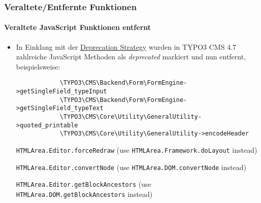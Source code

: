 
\begin{frame}[fragile]
	\frametitle{Veraltete/Entfernte Funktionen}
	\framesubtitle{Veraltete JavaScript Funktionen entfernt}

	\begin{itemize}
		\item In Einklang mit der \href{http://forge.typo3.org/projects/typo3v4-core/wiki/CoreDevPolicy}{Deprecation Strategy}
			wurden in TYPO3 CMS 4.7 zahlreiche JavaScript Methoden als \textit{deprecated} markiert und nun entfernt, beispielsweise:

		\begin{lstlisting}
			\TYPO3\CMS\Backend\Form\FormEngine->getSingleField_typeInput
			\TYPO3\CMS\Backend\Form\FormEngine->getSingleField_typeText
			\TYPO3\CMS\Core\Utility\GeneralUtility->quoted_printable
			\TYPO3\CMS\Core\Utility\GeneralUtility->encodeHeader
		\end{lstlisting}

		\smaller
			\texttt{HTMLArea.Editor.forceRedraw}\newline
				(use \texttt{HTMLArea.Framework.doLayout} instead)
				\vspace{0.2cm}

			\texttt{HTMLArea.Editor.convertNode}\newline
				(use \texttt{HTMLArea.DOM.convertNode} instead)
				\vspace{0.2cm}

			\texttt{HTMLArea.Editor.getBlockAncestors}\newline
				(use \texttt{HTMLArea.DOM.getBlockAncestors} instead)
		\normalsize

	\end{itemize}

\end{frame}

